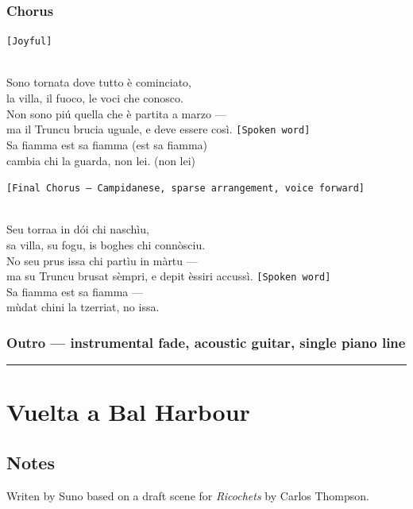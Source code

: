 \subsubsection{Chorus}\label{chorus-42}

\texttt{{[}Joyful{]}}\strut \\
Sono tornata dove tutto è cominciato,\\
la villa, il fuoco, le voci che conosco.\\
Non sono piú quella che è partita a marzo ---\\
ma il Truncu brucia uguale, e deve essere così.
\texttt{{[}Spoken\ word{]}}\\
Sa fiamma est sa fiamma (est sa fiamma)\\
cambia chi la guarda, non lei. (non lei)

\texttt{{[}Final\ Chorus\ —\ Campidanese,\ sparse\ arrangement,\ voice\ forward{]}}\strut \\
Seu torraa in dói chi naschìu,\\
sa villa, su fogu, is boghes chi connòsciu.\\
No seu prus issa chi partìu in màrtu ---\\
ma su Truncu brusat sèmpri, e depit èssiri accussì.
\texttt{{[}Spoken\ word{]}}\\
Sa fiamma est sa fiamma ---\\
mùdat chini la tzerriat, no issa.

\subsubsection{Outro --- instrumental fade, acoustic guitar, single
piano
line}\label{outro-instrumental-fade-acoustic-guitar-single-piano-line}

\begin{center}\rule{0.5\linewidth}{0.5pt}\end{center}

\section{Vuelta a Bal Harbour}\label{vuelta-a-bal-harbour}

\subsection{Notes}\label{notes-18}

Writen by Suno based on a draft scene for \emph{Ricochets} by Carlos
Thompson.


